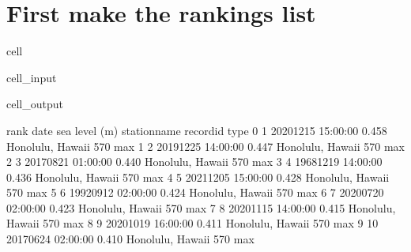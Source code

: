 \documentclass[letterpaper,10pt,english]{jupyterBook}
\begin{document}
\chapter{First make the rankings list}
\label{\detokenize{notebooks/regional_and_local/SL_Extremes_annual:first-make-the-rankings-list}}
\begin{sphinxuseclass}{cell}\begin{sphinxVerbatimInput}

\begin{sphinxuseclass}{cell_input}
\begin{sphinxVerbatim}[commandchars=\\\{\}]
  
  
\PYG{p}{[}\PYG{p}{]}  \PYG{p}{[}\PYG{p}{]}
  

  \PYG{p}{[}\PYG{p}{[}\PYG{p}{]}\PYG{p}{]}
\end{sphinxVerbatim}

\end{sphinxuseclass}\end{sphinxVerbatimInput}
\begin{sphinxVerbatimOutput}

\begin{sphinxuseclass}{cell_output}
\begin{sphinxVerbatim}[commandchars=\\\{\}]
   rank                date  sea level (m)      station\PYGZus{}name record\PYGZus{}id type
0     1 2020\PYGZhy{}12\PYGZhy{}15 15:00:00          0.458  Honolulu, Hawaii       570  max
1     2 2019\PYGZhy{}12\PYGZhy{}25 14:00:00          0.447  Honolulu, Hawaii       570  max
2     3 2017\PYGZhy{}08\PYGZhy{}21 01:00:00          0.440  Honolulu, Hawaii       570  max
3     4 1968\PYGZhy{}12\PYGZhy{}19 14:00:00          0.436  Honolulu, Hawaii       570  max
4     5 2021\PYGZhy{}12\PYGZhy{}05 15:00:00          0.428  Honolulu, Hawaii       570  max
5     6 1992\PYGZhy{}09\PYGZhy{}12 02:00:00          0.424  Honolulu, Hawaii       570  max
6     7 2020\PYGZhy{}07\PYGZhy{}20 02:00:00          0.423  Honolulu, Hawaii       570  max
7     8 2020\PYGZhy{}11\PYGZhy{}15 14:00:00          0.415  Honolulu, Hawaii       570  max
8     9 2020\PYGZhy{}10\PYGZhy{}19 16:00:00          0.411  Honolulu, Hawaii       570  max
9    10 2017\PYGZhy{}06\PYGZhy{}24 02:00:00          0.410  Honolulu, Hawaii       570  max
\end{sphinxVerbatim}


\end{sphinxuseclass}
\end{sphinxVerbatimOutput}
\end{sphinxuseclass}
\end{document}
